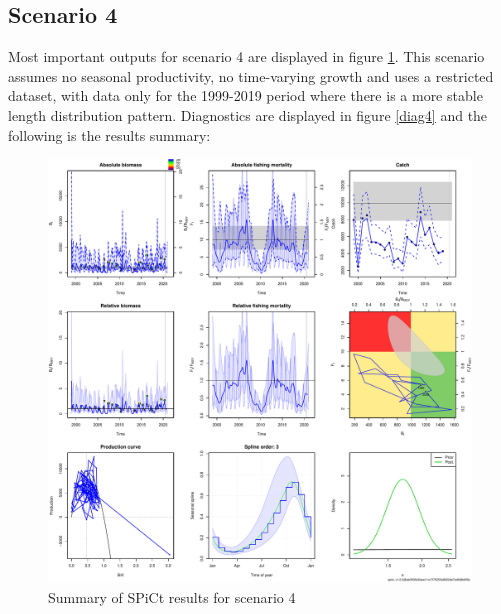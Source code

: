 \documentclass[review]{elsarticle}
\begin{document}
\subsection{Scenario 4}
Most important outputs for scenario 4 are displayed in figure \ref{scenario4out}. This scenario assumes no seasonal productivity, no time-varying growth and uses a restricted dataset, with data only for the 1999-2019 period where there is a more stable length distribution pattern. Diagnostics are displayed in figure \ref{diag4} and the following is the results summary:



\begin{figure}[h!]
 \centering
 \includegraphics[]{./scenario4out.pdf}
 \caption{Summary of SPiCt results for scenario 4}
 \label{scenario4out}
\end{figure}
\end{document}
